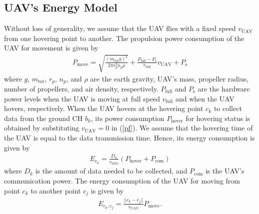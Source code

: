 \documentclass[journal]{IEEEtran}
\begin{document}
    \subsection{UAV's Energy Model}
    Without loss of generality, we assume that the UAV flies with a fixed speed $v_\text{UAV}$ from one hovering point to another. The propulsion power consumption of the UAV for movement is given by \cite{M. B. Ghorbel, J. Yao and N. Ansari}
    \begin{align}
	    \label{pf}
	    P_{\text{move}} = \sqrt{\frac{\left(m_{\text{tot}}g \right)^3}{2 \pi r^2_{p}n_{p}\rho}} + \frac{P_{\text{full}}-P_{\text{s}}}{v_{\text{full}}}v_{\text{UAV}} + P_{\text{s}}
	\end{align}
	where $g$, $m_{\text{tot}}$, $r_p$, $n_p$, and $\rho$ are the earth gravity, UAV's mass, propeller radius, number of propellers, and air density, respectively. $P_{\text{full}}$ and $P_\text{s}$ are the hardware power levels when the UAV is moving at full speed $v_{\text{full}}$ and when the UAV hovers, respectively. When the UAV hovers at the hovering point $c_k$ to collect data from the ground CH $b_k$, its power consumption $ P_{\text{hover}}$ for hovering status is obtained by substituting $v_{\text{UAV}}=0$ in (\ref{pf}).
    We assume that the hovering time of the UAV is equal to the data transmission time. Hence, its energy consumption is given by
    \begin{align}
	    E_{c_k} = \frac{D_k}{r_{\text{data}}}(P_{\text{hover}} + P_{\text{com}})
	\end{align}
	where $D_k$ is the amount of data needed to be collected, and $P_{\text{com}}$ is the UAV's communication power. The energy consumption of the UAV for moving from point $c_k$ to another point $c_j$ is given by
	 \begin{eqnarray}
	 \label{eck}
            E_{c_k,c_j} = \frac{||c_k-c_j||}{v_\text{UAV}}P_{\text{move}}.
    \end{eqnarray}
\end{document}

